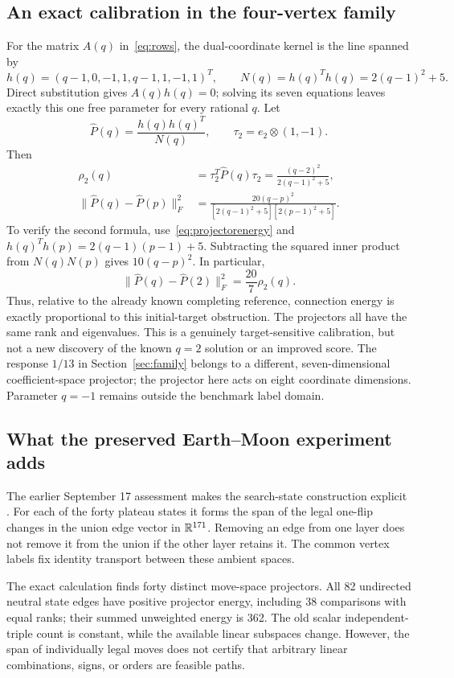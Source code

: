 \documentclass[11pt,letterpaper]{article}
\theoremstyle{definition}
\theoremstyle{remark}\newtheorem{remark}[theorem]{Remark}
\begin{document}
\subsection{An exact calibration in the four-vertex family}
For the matrix $A(q)$ in~\eqref{eq:rows}, the dual-coordinate kernel is the line spanned by
\[
h(q)=(q-1,0,-1,1,q-1,1,-1,1)^T,
\qquad N(q)=h(q)^Th(q)=2(q-1)^2+5.
\]
Direct substitution gives $A(q)h(q)=0$; solving its seven equations leaves exactly this one free parameter for every rational $q$. Let
\[
\widehat P(q)=\frac{h(q)h(q)^T}{N(q)},\qquad
\tau_2=e_2\otimes(1,-1).
\]
Then
\begin{align}
\rho_2(q)&=\tau_2^T\widehat P(q)\tau_2
=\frac{(q-2)^2}{2(q-1)^2+5},\label{eq:qresidual}\\
\|\widehat P(q)-\widehat P(p)\|_F^2
&=\frac{20(q-p)^2}{[2(q-1)^2+5][2(p-1)^2+5]}.
\label{eq:qenergy}
\end{align}
To verify the second formula, use~\eqref{eq:projectorenergy} and
$h(q)^Th(p)=2(q-1)(p-1)+5$. Subtracting the squared inner product from $N(q)N(p)$ gives $10(q-p)^2$. In particular,
\begin{equation}\label{eq:qbridge}
\|\widehat P(q)-\widehat P(2)\|_F^2=\frac{20}{7}\rho_2(q).
\end{equation}
Thus, relative to the already known completing reference, connection energy is exactly proportional to this initial-target obstruction. The projectors all have the same rank and eigenvalues. This is a genuinely target-sensitive calibration, but not a new discovery of the known $q=2$ solution or an improved score. The response $1/13$ in Section~\ref{sec:family} belongs to a different, seven-dimensional coefficient-space projector; the projector here acts on eight coordinate dimensions. Parameter $q=-1$ remains outside the benchmark label domain.

\subsection{What the preserved Earth--Moon experiment adds}
The earlier September 17 assessment makes the search-state construction explicit \cite{BeasleyEnergyAssessment}. For each of the forty plateau states it forms the span of the legal one-flip changes in the union edge vector in $\mathbb R^{171}$. Removing an edge from one layer does not remove it from the union if the other layer retains it. The common vertex labels fix identity transport between these ambient spaces.

The exact calculation finds forty distinct move-space projectors. All 82 undirected neutral state edges have positive projector energy, including 38 comparisons with equal ranks; their summed unweighted energy is 362. The old scalar independent-triple count is constant, while the available linear subspaces change. However, the span of individually legal moves does not certify that arbitrary linear combinations, signs, or orders are feasible paths.
\end{document}
